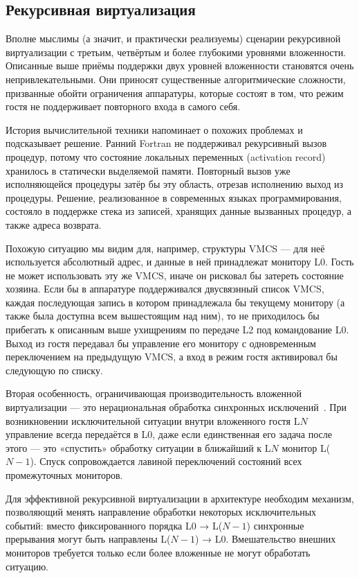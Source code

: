 \subsection{Рекурсивная виртуализация}

Вполне мыслимы (а значит, и практически реализуемы) сценарии рекурсивной виртуализации с третьим, четвёртым и более глубокими уровнями вложенности. Описанные выше приёмы поддержки двух уровней вложенности становятся очень непривлекательными. Они приносят существенные алгоритмические сложности, призванные обойти ограничения аппаратуры, которые состоят в том, что режим гостя не поддерживает повторного входа в самого себя.

История вычислительной техники напоминает о похожих проблемах и подсказывает решение. Ранний Fortran не поддерживал рекурсивный вызов процедур, потому что состояние локальных переменных (activation record) хранилось в статически выделяемой памяти. Повторный вызов уже исполняющейся процедуры затёр бы эту область, отрезав исполнению выход из процедуры. Решение, реализованное в современных языках программирования, состояло в поддержке стека из записей, хранящих данные вызванных процедур, а также адреса возврата.

Похожую ситуацию мы видим для, например, структуры VMCS — для неё используется абсолютный адрес, и данные в ней принадлежат монитору L0. Гость не может использовать эту же VMCS, иначе он рисковал бы затереть состояние хозяина. Если бы в аппаратуре поддерживался двусвязнный список VMCS, каждая последующая запись в котором принадлежала бы текущему монитору (а также была доступна всем вышестоящим над ним), то не приходилось бы прибегать к описанным выше ухищрениям по передаче L2 под командование L0. Выход из гостя передавал бы управление его монитору с одновременным переключением на предыдущую VMCS, а вход в режим гостя активировал бы следующую по списку.

Вторая особенность, ограничивающая производительность вложенной виртуализации — это нерациональная обработка синхронных исключений \cite{recursive-virt-poon}. При возникновении исключительной ситуации внутри вложенного гостя L$N$ управление всегда передаётся в L0, даже если единственная его задача после этого — это «спустить» обработку ситуации в ближайший к L$N$ монитор L($N-1$). Спуск сопровождается лавиной переключений состояний всех промежуточных мониторов.

Для эффективной рекурсивной виртуализации в архитектуре необходим механизм, позволяющий менять направление обработки некоторых исключительных событий: вместо фиксированного порядка L0 → L($N-1$) синхронные прерывания могут быть направлены L($N-1$) → L0. Вмешательство внешних мониторов требуется только если более вложенные не могут обработать ситуацию.


